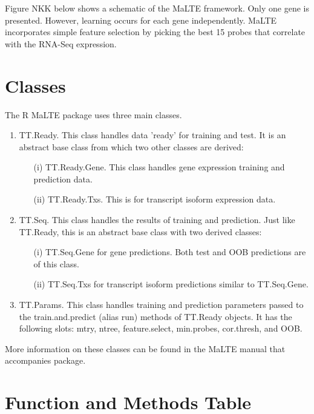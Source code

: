 \documentclass[a4paper,12pt]{article}
\begin{document}
Figure NKK below shows a schematic of the MaLTE framework. Only one gene is presented. However, learning occurs for each gene independently. MaLTE incorporates simple feature selection by picking the best 15 probes that correlate with the RNA-Seq expression.

\section{Classes}
The R MaLTE package uses three main classes.
\begin{enumerate}
\item TT.Ready. This class handles data 'ready' for training and test. It is an abstract base class from which two other classes are derived:
\begin{enumerate}
\item[(i)] TT.Ready.Gene. This class handles gene expression training and prediction data.
\item[(ii)] TT.Ready.Txs. This is for transcript isoform expression data.
\end{enumerate}

\item TT.Seq. This class handles the results of training and prediction. Just like TT.Ready, this is an abstract base class with two derived classes:
\begin{enumerate}
\item[(i)] TT.Seq.Gene for gene predictions. Both test and OOB predictions are of this class.
\item[(ii)] TT.Seq.Txs for transcript isoform predictions similar to TT.Seq.Gene.
\end{enumerate}

\item TT.Params. This class handles training and prediction parameters passed to the train.and.predict (alias run) methods of TT.Ready objects. It has the following slots: mtry, ntree, feature.select, min.probes, cor.thresh, and OOB.
\end{enumerate}

More information on these classes can be found in the MaLTE manual that accompanies package.

\section{Function and Methods Table}
\end{document}
